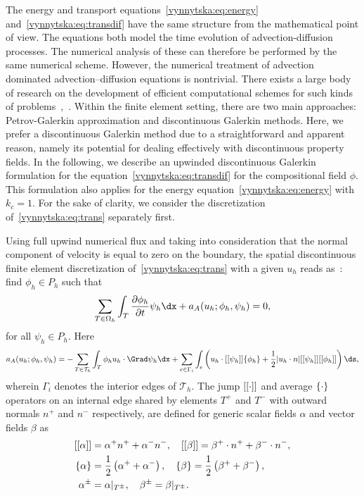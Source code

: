 The energy and transport equations~\eqref{vynnytska:eq:energy}
and~\eqref{vynnytska:eq:transdif} have the same structure from the
mathematical point of view. The equations both model the time
evolution of advection-diffusion processes. The numerical analysis of
these can therefore be performed by the same numerical
scheme. However, the numerical treatment of advection dominated
advection--diffusion equations is nontrivial. There exists a large
body of research on the development of efficient computational schemes
for such kinds of
problems~\citep{Lin2006},~\citep{ZienkiewiczTaylor2000}.  Within the
finite element setting, there are two main approaches: Petrov-Galerkin
approximation and discontinuous Galerkin methods. Here, we prefer a
discontinuous Galerkin method due to a straightforward and apparent
reason, namely its potential for dealing effectively with
discontinuous property fields. In the following, we describe an
upwinded discontinuous Galerkin formulation for the
equation~\eqref{vynnytska:eq:transdif} for the compositional field
$\phi$. This formulation also applies for the energy
equation~\eqref{vynnytska:eq:energy} with $k_c = 1$. For the sake of
clarity, we consider the discretization of~\eqref{vynnytska:eq:trans}
separately first.

Using full upwind numerical flux and taking into consideration that
the normal component of velocity is equal to zero on the boundary, the
spatial discontinuous finite element discretization
of~\eqref{vynnytska:eq:trans} with a given $u_h$ reads
as~\citep{PietroLoForteParolini2006}: find $\phi_h \in P_h$
such that
\begin{equation}
  \sum_{T \in \Omega_h} \int_T \frac{\partial \phi_h}{\partial t} \psi_h
  \dx + a_{A} (u_h; \phi_h, \psi_h) = 0,
\end{equation}
for all $\psi_h \in P_h$. Here
\begin{equation}
  \label{vynnytska:eq:dgadv}
   a_{A} (u_h; \phi_h, \psi_h )
   =
   - \sum_{T \in \mathcal{T}_h} \int_T \phi_h u_h \cdot \Grad \psi_h \dx
   + \sum_{e \in \Gamma_i} \int_{e} \left (
   u_h \cdot \jump{\psi_h} \avg{\phi_h} + \frac{1}{2}
   | u_h \cdot n | \jump{\psi_h} \jump{\phi_h} \right ) \ds,
\end{equation}
wherein $\Gamma_i$ denotes the interior edges of $\mathcal{T}_h$. The jump
$[[\cdot]]$ and average $\{\cdot\}$ operators on an internal edge
shared by elements $T^{+}$ and $T^{-}$ with outward normals $n^+$ and
$n^-$ respectively, are defined for generic scalar fields $\alpha$ and
vector fields $\beta$ as
\begin{align}
  [[\alpha]]&= \alpha^{+} n^{+} + \alpha^{-} n^{-}, \quad
  [[\beta]]  = \beta^{+} \cdot n^{+} + \beta^{-} \cdot n^{-}, \\
  \{\alpha\} &= \frac{1}{2} \left( \alpha^{+} + \alpha^{-} \right), \quad
  \{\beta\}   = \frac{1}{2} \left( \beta^{+} + \beta^{-} \right), \\
  \alpha^{\pm}  &= \alpha |_{T^{\pm}}, \quad
  \beta^{\pm}    = \beta |_{T^{\pm}}.
\end{align}

